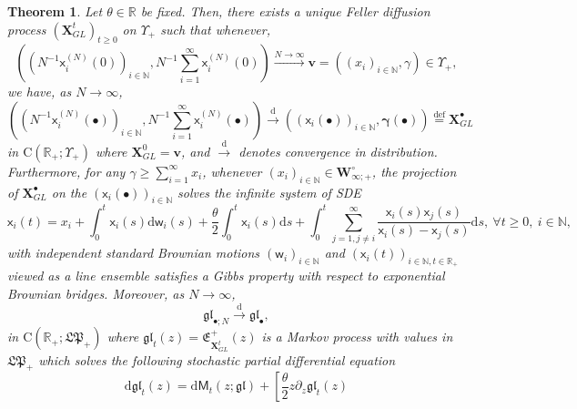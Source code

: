\documentclass[]{article}
\newtheorem{thm}{Theorem}[section]
\begin{document}
\begin{thm}\label{ThmMainGLN}
Let $\theta\in \mathbb{R}$ be fixed. Then, there exists a unique Feller diffusion process $(\mathbf{X}_{GL}^t)_{t\ge 0}$ on $\Upsilon_+$ such that whenever, 
\begin{equation*}
\left((N^{-1}\mathsf{x}_i^{(N)}(0))_{i\in \mathbb{N}},N^{-1}\sum_{i=1}^\infty \mathsf{x}_i^{(N)}(0)\right)  \overset{N \to \infty}{\longrightarrow} \boldsymbol{v}=((x_i)_{i\in \mathbb{N}},\gamma)\in \Upsilon_+,
\end{equation*}
we have, as $N \to \infty$,
\begin{equation*}
\left((N^{-1}\mathsf{x}_i^{(N)}(\bullet))_{i\in \mathbb{N}},N^{-1}\sum_{i=1}^\infty \mathsf{x}_i^{(N)}(\bullet)\right) \overset{\mathrm{d}}{\longrightarrow} \left((\mathsf{x}_i(\bullet))_{i\in \mathbb{N}},\boldsymbol{\gamma}(\bullet)\right)\overset{\mathrm{def}}{=} \mathbf{X}_{GL}^\bullet
\end{equation*}
in $\mathrm{C}(\mathbb{R}_+;\Upsilon_+)$
where $\mathbf{X}_{GL}^0=\boldsymbol{v}$, and $\overset{\mathrm{d}}{\longrightarrow}$ denotes convergence in distribution.
Furthermore, for any $\gamma\ge \sum_{i=1}^\infty x_i$, whenever $(x_i)_{i\in \mathbb{N}}\in \mathbf{W}_{\infty;+}^\circ$, the projection of $\mathbf{X}_{GL}^\bullet$ on the $(\mathsf{x}_i(\bullet))_{i\in \mathbb{N}}$ solves the infinite system of SDE
\begin{equation}\label{ISDEGL}
\mathsf{x}_i(t)= x_i+\int_0^t\mathsf{x}_i(s)\mathrm{d}\mathsf{w}_i(s) + \frac{\theta}{2}\int_0^t\mathsf{x}_i(s)\mathrm{d}s
 +\int_0^t\sum_{j=1,j\neq i}^{\infty}\frac{\mathsf{x}_i(s)\mathsf{x}_j(s)}{\mathsf{x}_i(s)-\mathsf{x}_j(s)}\mathrm{d}s, \  \forall t\ge 0 , \   i \in \mathbb{N},
 \end{equation}
with independent standard Brownian motions $(\mathsf{w}_i)_{i\in \mathbb{N}}$ and $(\mathsf{x}_i(t))_{i\in \mathbb{N},t\in \mathbb{R}_+}$ viewed as a line ensemble satisfies a  Gibbs  property with respect to exponential Brownian bridges. Moreover, as $N\to \infty$,
\begin{equation*}
\mathfrak{gl}_{\bullet;N}\overset{\mathrm{d}}{\longrightarrow} \mathfrak{gl}_\bullet,
\end{equation*}
in $\mathrm{C}(\mathbb{R}_+;\mathfrak{LP}_+)$ where $\mathfrak{gl}_t(z)=\mathfrak{E}_{\mathbf{X}_{GL}^t}^+(z)$ is a Markov process with values in $\mathfrak{LP}_+$ which solves the following stochastic partial differential equation 
\begin{equation}\label{GLequation}
\mathrm{d}\mathfrak{gl}_t(z)=\mathrm{d}\mathsf{M}_t(z;\mathfrak{gl})+\left[\frac{\theta}{2}z\partial_z\mathfrak{gl}_t(z)

\end{equation}
\end{thm}
\end{document}
